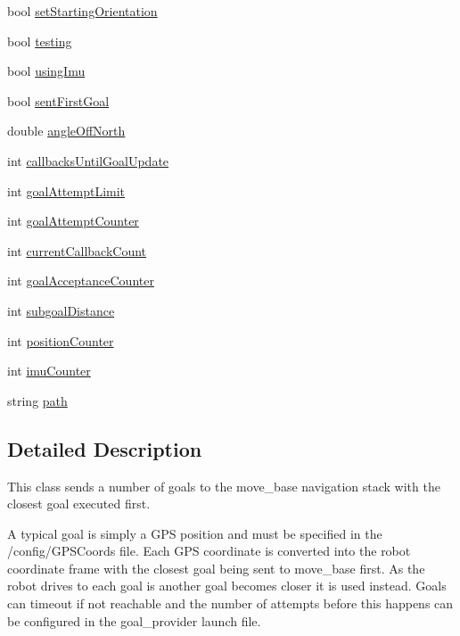 \begin{DoxyCompactItemize}
\item 
bool \hyperlink{classGoalProvider_a94c6c903648ec2ff61396d04686bc466}{set\-Starting\-Orientation}
\item 
bool \hyperlink{classGoalProvider_aefb932adf68011afd36e0796a001c147}{testing}
\item 
bool \hyperlink{classGoalProvider_a344bf023e320a812a824654c69531f31}{using\-Imu}
\item 
bool \hyperlink{classGoalProvider_aa576e5466ea93048ed6c231f226c9658}{sent\-First\-Goal}
\item 
double \hyperlink{classGoalProvider_a165b0eda7247ff32649b097a3e2d160a}{angle\-Off\-North}
\item 
int \hyperlink{classGoalProvider_a7ac4fe26923010d8bcb85fd50b90e259}{callbacks\-Until\-Goal\-Update}
\item 
int \hyperlink{classGoalProvider_ab63657ef75bd9c478d01b270a142103e}{goal\-Attempt\-Limit}
\item 
int \hyperlink{classGoalProvider_a35c75c0ef169d26dc40393e988f6f9ef}{goal\-Attempt\-Counter}
\item 
int \hyperlink{classGoalProvider_aca962edcdb380d56a7e551de7b5c36a6}{current\-Callback\-Count}
\item 
int \hyperlink{classGoalProvider_a27a290eb0662fbb7dc1dbe696f9fcb00}{goal\-Acceptance\-Counter}
\item 
int \hyperlink{classGoalProvider_ad4a03daf04350450ceee088c9f5f6c54}{subgoal\-Distance}
\item 
int \hyperlink{classGoalProvider_a9f314d13331aa611c5b96202742be0e9}{position\-Counter}
\item 
int \hyperlink{classGoalProvider_a1429bea432a6411c063cd3cf4990f1ca}{imu\-Counter}
\item 
string \hyperlink{classGoalProvider_a82146db14a5565a12fe979c68156d45c}{path}
\end{DoxyCompactItemize}


\subsection{\-Detailed \-Description}
\-This class sends a number of goals to the move\-\_\-base navigation stack with the closest goal executed first. 

\-A typical goal is simply a \-G\-P\-S position and must be specified in the /config/\-G\-P\-S\-Coords file. \-Each \-G\-P\-S coordinate is converted into the robot coordinate frame with the closest goal being sent to move\-\_\-base first. \-As the robot drives to each goal is another goal becomes closer it is used instead. \-Goals can timeout if not reachable and the number of attempts before this happens can be configured in the goal\-\_\-provider launch file.

